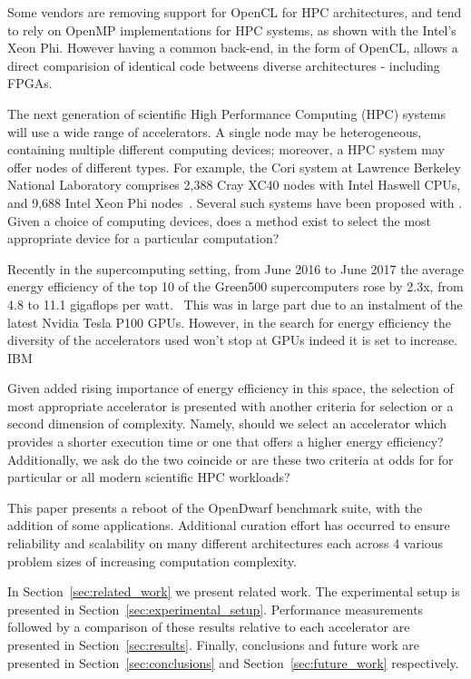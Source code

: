 \documentclass[../document.tex]{subfiles}
\begin{document}
\label{sec:introduction}

Some vendors are removing support for OpenCL for HPC architectures, and tend to rely on OpenMP implementations for HPC systems, as shown with the Intel's Xeon Phi.
However having a common back-end, in the form of OpenCL, allows a direct comparision of identical code betweens diverse architectures - including FPGAs.

The next generation of scientific High Performance Computing (HPC) systems will use a wide range of accelerators.
A single node may be heterogeneous, containing multiple different computing devices; moreover, a HPC system may offer nodes of different types.
For example, the Cori system at Lawrence Berkeley National Laboratory comprises 2,388 Cray XC40 nodes with Intel Haswell CPUs, and 9,688 Intel Xeon Phi nodes~\cite{declerck2016cori}.
Several such systems have been proposed with . 
Given a choice of computing devices, does a method exist to select the most appropriate device for a particular computation?


Recently in the supercomputing setting, from June 2016 to June 2017 the average energy efficiency of the top 10 of the Green500 supercomputers rose by 2.3x, from 4.8 to 11.1 gigaflops per watt.~\cite{feldman_2017}
This was in large part due to an instalment of the latest Nvidia Tesla P100 GPUs.
However, in the search for energy efficiency the diversity of the accelerators used won't stop at GPUs indeed it is set to increase.
IBM

Given added rising importance of energy efficiency in this space, the selection of most appropriate accelerator is presented with another criteria for selection or a second dimension of complexity.
Namely, should we select an accelerator which provides a shorter execution time or one that offers a higher energy efficiency?
Additionally, we ask do the two coincide or are these two criteria at odds for for particular or all modern scientific HPC workloads?

This paper presents a reboot of the OpenDwarf benchmark suite, with the addition of some applications.
Additional curation effort has occurred to ensure reliability and scalability on many different architectures each across 4 various problem sizes of increasing computation complexity.

In Section~\ref{sec:related_work} we present related work.
The experimental setup is presented in Section~\ref{sec:experimental_setup}.
Performance measurements followed by a comparison of these results relative to each accelerator are presented in Section~\ref{sec:results}.
Finally, conclusions and future work are presented in Section~\ref{sec:conclusions} and Section~\ref{sec:future_work} respectively.
\end{document}
